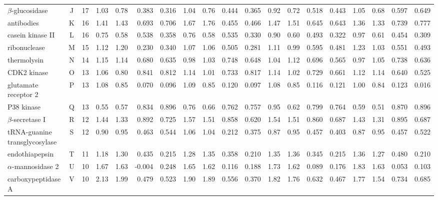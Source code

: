 \begin{table}
\begin{tabular}{lcrrrrrrrrrrrrrrrrr}
$\beta$-glucosidase            & J &  17 & 1.03 & 0.78 & 0.383 & 0.316 & 1.04 & 0.76 & 0.444 & 0.365 & 0.92 & 0.72 & 0.518 & 0.443 & 1.05 & 0.68 & 0.597 & 0.649\\
antibodies                     & K &  16 & 1.41 & 1.43 & 0.693 & 0.706 & 1.67 & 1.76 & 0.455 & 0.466 & 1.47 & 1.51 & 0.645 & 0.643 & 1.36 & 1.33 & 0.739 & 0.777\\
casein kinase II               & L &  16 & 0.75 & 0.58 & 0.538 & 0.358 & 0.76 & 0.58 & 0.535 & 0.330 & 0.90 & 0.60 & 0.493 & 0.322 & 0.97 & 0.61 & 0.454 & 0.309\\
ribonuclease                   & M &  15 & 1.12 & 1.20 & 0.230 & 0.340 & 1.07 & 1.06 & 0.505 & 0.281 & 1.11 & 0.99 & 0.595 & 0.481 & 1.23 & 1.03 & 0.551 & 0.493\\
thermolysin                    & N &  14 & 1.15 & 1.14 & 0.680 & 0.635 & 0.98 & 1.03 & 0.748 & 0.648 & 1.04 & 1.12 & 0.696 & 0.565 & 0.97 & 1.05 & 0.738 & 0.636\\
CDK2 kinase                    & O &  13 & 1.06 & 0.80 & 0.841 & 0.812 & 1.14 & 1.01 & 0.733 & 0.817 & 1.14 & 1.02 & 0.729 & 0.661 & 1.12 & 1.14 & 0.640 & 0.525\\
glutamate receptor 2           & P &  13 & 1.08 & 0.85 & 0.070 & 0.096 & 1.09 & 0.85 & 0.120 & 0.097 & 1.08 & 0.85 & 0.116 & 0.121 & 1.00 & 0.84 & 0.123 & 0.016\\
P38 kinase                     & Q &  13 & 0.55 & 0.57 & 0.834 & 0.896 & 0.76 & 0.66 & 0.762 & 0.757 & 0.95 & 0.62 & 0.799 & 0.764 & 0.59 & 0.51 & 0.870 & 0.896\\
$\beta$-secretase I            & R &  12 & 1.44 & 1.33 & 0.892 & 0.725 & 1.57 & 1.51 & 0.858 & 0.620 & 1.54 & 1.51 & 0.860 & 0.687 & 1.43 & 1.31 & 0.895 & 0.687\\
tRNA-guanine transglycosylase  & S &  12 & 0.90 & 0.95 & 0.463 & 0.544 & 1.06 & 1.04 & 0.212 & 0.375 & 0.87 & 0.95 & 0.457 & 0.403 & 0.87 & 0.95 & 0.457 & 0.522\\
endothiapepsin                 & T &  11 & 1.18 & 1.30 & 0.435 & 0.215 & 1.28 & 1.35 & 0.358 & 0.210 & 1.35 & 1.36 & 0.345 & 0.215 & 1.36 & 1.27 & 0.480 & 0.210\\
$\alpha$-mannosidase 2         & U &  10 & 1.67 & 1.63 &-0.004 & 0.248 & 1.65 & 1.62 & 0.116 & 0.188 & 1.73 & 1.62 & 0.089 & 0.176 & 1.83 & 1.63 & 0.053 & 0.103\\
carboxypeptidase A             & V &  10 & 2.13 & 1.99 & 0.479 & 0.523 & 1.90 & 1.89 & 0.556 & 0.370 & 1.82 & 1.76 & 0.632 & 0.467 & 1.77 & 1.54 & 0.734 & 0.685\\

\end{tabular}
\end{table}
